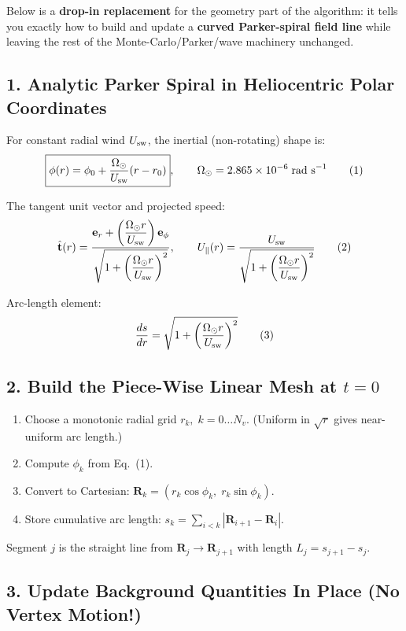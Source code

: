 Below is a \textbf{drop-in replacement} for the geometry part of the algorithm: it tells you exactly how to build and update a \textbf{curved Parker-spiral field line} while leaving the rest of the Monte-Carlo/Parker/wave machinery unchanged.

\subsection*{1. Analytic Parker Spiral in Heliocentric Polar Coordinates}

For constant radial wind $U_{\rm sw}$, the inertial (non-rotating) shape is:
\[
\boxed{
\phi(r) = \phi_0 + \frac{\Omega_\odot}{U_{\rm sw}}(r - r_0)}, \qquad
\Omega_\odot = 2.865 \times 10^{-6} \; \text{rad s}^{-1} \tag{1}
\]

The tangent unit vector and projected speed:
\[
\hat{\mathbf{t}}(r) = 
\frac{\mathbf{e}_r + \left(\dfrac{\Omega_\odot r}{U_{\rm sw}}\right)\mathbf{e}_\phi}
     {\sqrt{1 + \left(\dfrac{\Omega_\odot r}{U_{\rm sw}}\right)^2}}, \qquad
U_\parallel(r) = \frac{U_{\rm sw}}{\sqrt{1 + \left(\dfrac{\Omega_\odot r}{U_{\rm sw}}\right)^2}} \tag{2}
\]

Arc-length element:
\[
\frac{ds}{dr} = \sqrt{1 + \left( \frac{\Omega_\odot r}{U_{\rm sw}} \right)^2} \tag{3}
\]

\subsection*{2. Build the Piece-Wise Linear Mesh at $t=0$}

\begin{enumerate}
\item Choose a monotonic radial grid $r_k,\;k=0\ldots N_v$. (Uniform in $\sqrt{r}$ gives near-uniform arc length.)
\item Compute $\phi_k$ from Eq.~(1).
\item Convert to Cartesian: $\mathbf{R}_k = (r_k\cos\phi_k,\; r_k\sin\phi_k)$.
\item Store cumulative arc length: $s_k = \sum_{i<k} |\mathbf{R}_{i+1} - \mathbf{R}_i|$.
\end{enumerate}

Segment $j$ is the straight line from $\mathbf{R}_j \to \mathbf{R}_{j+1}$ with length $L_j = s_{j+1} - s_j$.

\subsection*{3. Update Background Quantities In Place (No Vertex Motion!)}

